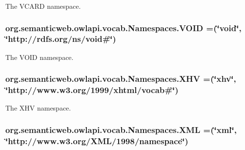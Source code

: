 The V\-C\-A\-R\-D namespace. \hypertarget{enumorg_1_1semanticweb_1_1owlapi_1_1vocab_1_1_namespaces_ad74d6d9013c1c795f549665402100ebd}{
\subsubsection[{V\-O\-I\-D}]{\setlength{\rightskip}{0pt plus 5cm}org.\-semanticweb.\-owlapi.\-vocab.\-Namespaces.\-V\-O\-I\-D =(\char`\"{}void\char`\"{}, \char`\"{}http\-://rdfs.\-org/{\bf ns}/void\#\char`\"{})}}\label{enumorg_1_1semanticweb_1_1owlapi_1_1vocab_1_1_namespaces_ad74d6d9013c1c795f549665402100ebd}
The V\-O\-I\-D namespace. \hypertarget{enumorg_1_1semanticweb_1_1owlapi_1_1vocab_1_1_namespaces_ac8b1d496f4d18244d0bcb85e8860e61e}{
\subsubsection[{X\-H\-V}]{\setlength{\rightskip}{0pt plus 5cm}org.\-semanticweb.\-owlapi.\-vocab.\-Namespaces.\-X\-H\-V =(\char`\"{}xhv\char`\"{}, \char`\"{}http\-://www.\-w3.\-org/1999/xhtml/vocab\#\char`\"{})}}\label{enumorg_1_1semanticweb_1_1owlapi_1_1vocab_1_1_namespaces_ac8b1d496f4d18244d0bcb85e8860e61e}
The X\-H\-V namespace. \hypertarget{enumorg_1_1semanticweb_1_1owlapi_1_1vocab_1_1_namespaces_ab711e79841c9a9cb42d72aabb1556578}{
\subsubsection[{X\-M\-L}]{\setlength{\rightskip}{0pt plus 5cm}org.\-semanticweb.\-owlapi.\-vocab.\-Namespaces.\-X\-M\-L =(\char`\"{}xml\char`\"{}, \char`\"{}http\-://www.\-w3.\-org/X\-M\-L/1998/namespace\char`\"{})}}\label{enumorg_1_1semanticweb_1_1owlapi_1_1vocab_1_1_namespaces_ab711e79841c9a9cb42d72aabb1556578}
